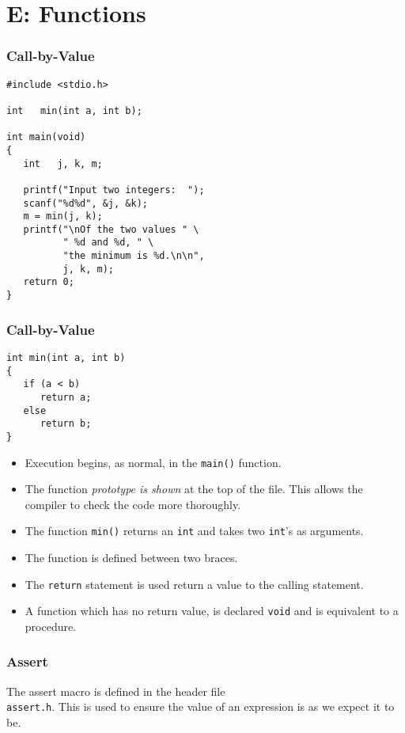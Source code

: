 \section{E: Functions}

\begin{frame}[fragile]
\frametitle{Call-by-Value}
\begin{verbatim}
#include <stdio.h>

int   min(int a, int b);

int main(void)
{
   int   j, k, m;

   printf("Input two integers:  ");
   scanf("%d%d", &j, &k);
   m = min(j, k);
   printf("\nOf the two values " \
          " %d and %d, " \
          "the minimum is %d.\n\n",
          j, k, m);
   return 0;
}
\end{verbatim}
\end{frame}

\begin{frame}[fragile]
\frametitle{Call-by-Value}

\begin{verbatim}
int min(int a, int b)
{
   if (a < b)
      return a;
   else
      return b;
}
\end{verbatim}

\begin{itemize}
\item Execution begins, as normal, in the \verb^main()^ function.
\item The function {\it prototype is shown} at the top of the file.
This allows the compiler to check the code more thoroughly.
\item The function \verb^min()^ returns an \verb^int^ and takes
two \verb^int^'s as arguments.
\item The function is defined between two braces.
\item The \verb^return^ statement is used return a value
to the calling statement.
\item A function which has no return value, is declared \verb^void^
and is equivalent to a procedure.
\end{itemize}
\end{frame}

\begin{frame}[fragile]
\frametitle{Assert}

The assert macro is defined in the header file\\ \verb^assert.h^.
This is used to ensure the value of an expression is as we
expect it to be.
\end{frame}

